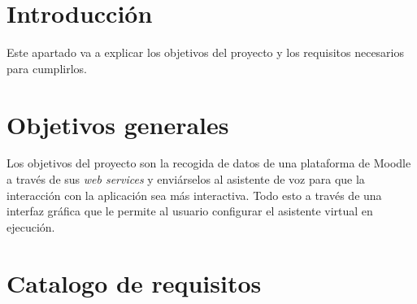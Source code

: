 
\section{Introducción}

Este apartado va a explicar los objetivos del proyecto y los requisitos necesarios para cumplirlos.

\section{Objetivos generales}

Los objetivos del proyecto son la recogida de datos de una plataforma de Moodle a través de sus \textit{web services} y enviárselos al asistente de voz para que la interacción con la aplicación sea más interactiva. Todo esto a través de una interfaz gráfica que le permite al usuario configurar el asistente virtual en ejecución.

\section{Catalogo de requisitos}

